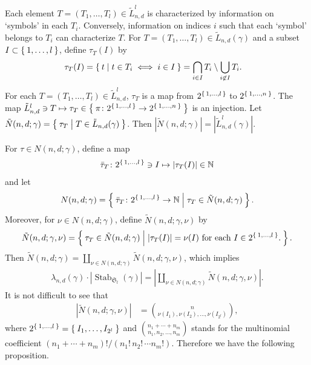 \documentclass{wstmp}
\begin{document}
Each element $T=(T_1,\ldots,T_l)\in \tilde L^l_{n,d}$ is characterized by
information on `symbols' in each $T_i$.
Conversely, 
information on indices $i$ such that each `symbol' belongs to $T_i$
can  characterize $T$.
For 
 $T=(T_1,\ldots,T_l)\in\tilde L_{n,d}(\gamma)$ 
 and a subset $I \subset \Set{1,\ldots,l}$,
 define $\tau_T(I)$ by
\begin{align*}
 \tau_T(I)&=\Set{t| t\in T_i \iff i \in I}
=\bigcap_{i\in I} T_i \setminus \bigcup_{i\not\in I} T_i .
\end{align*}
For 
each $T=(T_1,\ldots,T_l)\in\tilde L^l_{n,d}$,
$\tau_T$ is
a map from $2^{\set{1,\ldots,l}}$ to $2^{\Set{1,\ldots,n}}$.
The map 
 $\tilde L^l_{n,d}\ni T \mapsto \tau_T \in \Set{ \pi \colon  2^{\set{1,\ldots,l}} \to 2^{\Set{1,\ldots,n}}}$ 
is an injection.
Let $\tilde N(n,d;\gamma)=\Set{\tau_T |T \in \tilde  L_{n,d}(\gamma)}$.
Then ${\left|{\tilde N(n,d;\gamma)}\right|}={\left|{\tilde L^l_{n,d}(\gamma)}\right|}$.

For $\tau \in N(n,d;\gamma)$,
define a map
\begin{align*}
\bar \tau_T \colon 
2^{\set{1,\ldots,l}} \ni I \mapsto {\left|{\tau_T(I)}\right|} \in {\mathbb{N}}
\end{align*}
and let 
\begin{align*}
N(n,d;\gamma)=
\Set{
\bar \tau_T \colon 2^{\set{1,\ldots,l}} \to {\mathbb{N}}
|
\tau_T \in \tilde N(n,d;\gamma)
}.
\end{align*}
Moreover, for $\nu \in N(n,d;\gamma)$, define 
$\tilde N(n,d;\gamma,\nu)$ by
\begin{align*}
\tilde N(n,d;\gamma,\nu)=
\Set{\tau_T\in \tilde N(n,d;\gamma)|
\text{${\left|{\tau_T(I)}\right|}= \nu(I)$ for each $I \in 2^{\Set{1,\ldots,l}}$.} 
}.
\end{align*}
Then 
$\tilde N(n,d;\gamma)=\coprod_{\nu \in N(n,d;\gamma)} \tilde N(n,d;\gamma,\nu)$,
which implies
\begin{align*}
\lambda_{n,d}(\gamma)\cdot{\left|{{\operatorname{Stab}}_{\mathfrak{S}_l}(\gamma)}\right|}
={\left|{\coprod_{\nu \in N(n,d;\gamma)} \tilde N(n,d;\gamma,\nu)}\right|}.
\end{align*}
It is not difficult to see that
\begin{align*}
 {\left|{\tilde N(n,d;\gamma,\nu)}\right|}
& =\binom{n}{\nu(I_1), \nu(I_2), \ldots ,\nu(I_{2^l})},
\end{align*}
where 
$2^{\Set{1,\ldots,l}}=\Set{I_1,\ldots,I_{2^l}}$
and
$\binom{n_1+\cdots+n_m}{n_1,n_2,\ldots,n_m}$ stands for 
the multinomial coefficient $(n_1+\cdots+n_m)!/(n_1!\,n_2!\,\cdots n_m!)$.
Therefore we have the following proposition.
\end{document}
